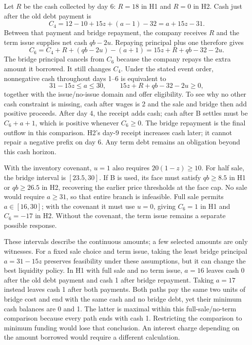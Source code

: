 Let $R$ be the cash collected by day 6: $R=18$ in H1 and $R=0$ in H2.
Cash just after the old debt payment is
\begin{equation}
 C_4=12-10+15z+(a-1)-32=a+15z-31.
\end{equation}
Between that payment and bridge repayment, the company receives $R$ and the
term issue supplies net cash $qb-2u$. Repaying principal plus one therefore gives
\begin{equation}
 C_6=C_4+R+(qb-2u)-(a+1)
     =15z+R+qb-32-2u.
\end{equation}
The bridge principal cancels from $C_6$ because the company repays the extra
amount it borrowed. It still changes $C_4$. Under the stated event order,
nonnegative cash throughout days 1--6 is equivalent to
\begin{equation}
 31-15z\leq a\leq30,
 \qquad 15z+R+qb-32-2u\geq0,
\end{equation}
together with the issue/no-issue domain and offer eligibility. To see why no
other cash constraint is missing, cash after wages is 2 and the sale and bridge
then add positive proceeds. After day 4, the receipt adds cash; cash after B
settles must be $C_6+a+1$, which is positive whenever $C_6\geq0$. The bridge
repayment is the final outflow in this comparison. H2's day-9 receipt increases
cash later; it cannot repair a negative prefix on day 6. Any term debt remains
an obligation beyond this cash horizon.

With the inventory covenant, $u=1$ also requires $20(1-z)\geq10$.
For half sale, the bridge interval is $[23.5,30]$. If B is used, its face must
satisfy $qb\geq8.5$ in H1 or $qb\geq26.5$ in H2, recovering the earlier price
thresholds at the face cap. No sale would require $a\geq31$, so that entire
branch is infeasible. Full sale permits $a\in[16,30]$; with the covenant it
must use $u=0$, giving $C_6=1$ in H1 and $C_6=-17$ in H2. Without the covenant,
the term issue remains a separate possible response.

These intervals describe the continuous amounts; a few selected amounts are
only witnesses. For a fixed sale choice and term issue, taking the least
bridge principal $a=31-15z$ preserves feasibility under these assumptions, but
it can change the best liquidity policy. In H1 with full sale and no term issue,
$a=16$ leaves cash 0 after the old debt payment and cash 1 after bridge
repayment. Taking $a=17$ instead leaves cash 1 after both payments. Both paths
pay the same two units of bridge cost and end with the same cash and no bridge
debt, yet their minimum cash balances are 0 and 1. The latter is maximal within
this full-sale/no-term comparison because every path ends with cash 1. Restricting
the comparison to minimum funding would lose that conclusion. An interest
charge depending on the amount borrowed would require a different calculation.

